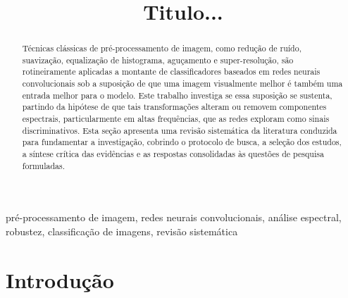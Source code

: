 \documentclass[conference]{IEEEtran}
\begin{document}
\title{Titulo...}

\author{
\and
{}
\and
{}
}

\maketitle

\begin{abstract}
Técnicas clássicas de pré-processamento de imagem, como redução de ruído,
suavização, equalização de histograma, aguçamento e super-resolução, são
rotineiramente aplicadas a montante de classificadores baseados em redes
neurais convolucionais sob a suposição de que uma imagem visualmente melhor
é também uma entrada melhor para o modelo. Este trabalho investiga se essa
suposição se sustenta, partindo da hipótese de que tais transformações alteram
ou removem componentes espectrais, particularmente em altas frequências, que
as redes exploram como sinais discriminativos. Esta seção apresenta uma revisão
sistemática da literatura conduzida para fundamentar a investigação, cobrindo o
protocolo de busca, a seleção dos estudos, a síntese crítica das evidências e
as respostas consolidadas às questões de pesquisa formuladas.
\end{abstract}

\begin{IEEEkeywords}
pré-processamento de imagem, redes neurais convolucionais, análise espectral,
robustez, classificação de imagens, revisão sistemática
\end{IEEEkeywords}

\section{Introdução}
\end{document}

